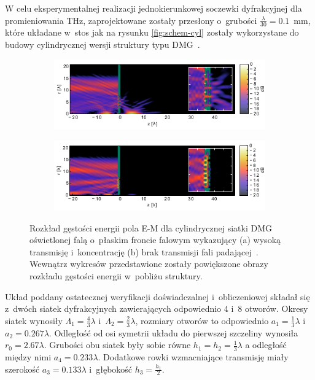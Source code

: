 W celu eksperymentalnej realizacji jednokierunkowej soczewki dyfrakcyjnej dla promieniowania THz, zaprojektowane zostały przesłony o~grubości $\frac{\lambda}{30}=0.1$~mm, które układane w~stos jak na rysunku \ref{fig:schem-cyl} zostały wykorzystane do budowy cylindrycznej wersji struktury typu DMG~\cite{Yavorskiy:14}. 
\begin{figure}[tb]
	\begin{subfigure}{\textwidth}
		\includegraphics[width=\textwidth]{images/dmg/express-high-kontrast-trans.png}
		\caption{}
	\end{subfigure}

	\begin{subfigure}{\textwidth}
		\includegraphics[width=\textwidth]{images/dmg/express-high-kontrast-block.png}
		\caption{}
	\end{subfigure}
	\caption{Rozkład gęstości energii pola E-M dla cylindrycznej siatki DMG oświetlonej falą o~płaskim froncie falowym wykazujący (a) wysoką transmisję i~koncentrację (b) brak transmisji fali padającej~\cite{Yavorskiy:14}. Wewnątrz wykresów przedstawione zostały powiększone obrazy rozkładu gęstości energii w~pobliżu struktury.}
	\label{fig:cyl-gest-ene}
\end{figure}

Układ poddany ostatecznej weryfikacji doświadczalnej i~obliczeniowej składał się z~dwóch siatek dyfrakcyjnych zawierających odpowiednio 4 i~8 otworów. Okresy siatek wynosiły $\Lambda_1=\frac{4}{3} \lambda$ i~$\Lambda_2=\frac{2}{3} \lambda$, rozmiary otworów to odpowiednio $a_1=\frac{1}{3}\lambda$ i~$a_2=0.267 \lambda$. Odległość od osi symetrii układu do pierwszej szczeliny wynosiła $r_0=2.67\lambda$. Grubości obu siatek były sobie równe $h_1=h_2=\frac{1}{3}\lambda$ a odległość między nimi $a_4=0.233\lambda$. Dodatkowe rowki wzmacniające transmisję miały szerokość $a_3=0.133\lambda$ i~głębokość $h_3=\frac{h_1}{2}$. 

